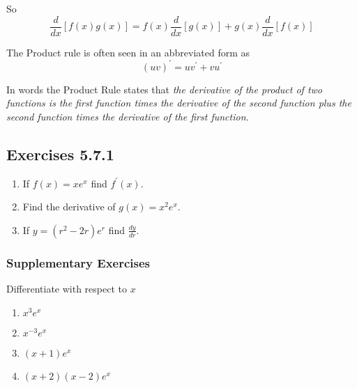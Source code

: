 So
\begin{equation*}\frac{d}{d x} \left [f (x) g (x)\right ] =f (x) \frac{d}{d x} \left [g (x)\right ] +g (x) \frac{d}{d x} \left [f (x)\right ]
\end{equation*}

The Product rule is often seen in an abbreviated form as
\begin{equation*}\left (u v\right )^{ \prime } =u v^{ \prime } +v u^{ \prime }
\end{equation*}

In words the Product Rule states that \textit{the derivative of the product of two functions is
the first function times the derivative of the second function plus the second function times the derivative of the first function.} 

\subsection{Exercises 5.7.1}
\begin{enumerate}
\item If $f (x) =x e^{x}$ find $f^{ \prime } (x)$. 

\item Find the derivative of $g (x) =x^{2} e^{x}$. 

\item If $y =\left (r^{2} -2 r\right ) e^{r}$ find $\frac{d y}{d r}$. \end{enumerate}


\subsubsection{Supplementary Exercises}
Differentiate with respect to $x$ 


\begin{enumerate}
\item $x^{3} e^{x}$ 

\item $x^{ -3} e^{x}$ 

\item $\left (x +1\right ) e^{x}$ 

\item $\left (x +2\right ) \left (x -2\right ) e^{x}$ \end{enumerate}


